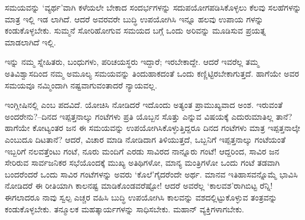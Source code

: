 ಸಮಯವನ್ನು ‘ವ್ಯರ್ಥ’ವಾಗಿ ಕಳೆಯಲೇ ಬೇಕಾದ ಸಂದರ್ಭಗಳನ್ನು ಸದುಪಯೋಗಪಡಿಸಿಕೊಳ್ಳಲು ಕೆಲವು ಸಲಹೆಗಳನ್ನು ಮಾತ್ರ ಇಲ್ಲಿ ಇಡ ಲಾಗಿದೆ. ಆದರೆ ಅವರವರೇ ಬುದ್ಧಿ ಉಪಯೋಗಿಸಿ ಇನ್ನೂ ಹಲವು ಉಪಾಯ ಗಳನ್ನು ಕಂಡುಕೊಳ್ಳಬೇಕು. ಸುಮ್ಮನೆ ಸೋರಿಹೋಗುವ ಸಮಯದ ಬಗ್ಗೆ ಒಂದು ಅರಿವನ್ನು ಮೂಡಿಸುವ ಪ್ರಯತ್ನ ಮಾಡಲಾಗಿದೆ ಇಲ್ಲಿ.

ಇನ್ನು ನಮ್ಮ ಸ್ನೇಹಿತರು, ಬಂಧುಗಳು, ಪರಿಚಯಸ್ಥರು ಇದ್ದಾರೆ; ಇರಬೇಕಾದ್ದೇ. ಆದರೆ ಇವರೆಲ್ಲ ತಮ್ಮ ಅತಿವಿಶ್ವಾಸದಿಂದ ನಮ್ಮ ಅಮೂಲ್ಯ ಸಮಯವನ್ನು ತಿಂದುಹಾಕದಂತೆ ಒಂದು ಕಣ್ಣಿಟ್ಟಿರಬೇಕಾಗುತ್ತದೆ. ಹಾಗೆಯೇ ಅವರ ಸಮಯವೂ ನಮ್ಮಿಂದಾಗಿ ನಷ್ಟವಾಗುವಂತಾದರೆ ನ್ಯಾಯವಲ್ಲ.

ಇಂಗ್ಲೀಷಿನಲ್ಲಿ ಎಂಬ ಪದವಿದೆ. ಯೋಚಿಸಿ ನೋಡಿದರೆ ಇದೊಂದು ಅತ್ಯಂತ ಪ್ರಾಮುಖ್ಯವಾದ ಅಂಶ.  ಇರುವಂತೆ  ಅಂದರೇನು?–ದಿನದ ಇಪ್ಪತ್ತನಾಲ್ಕು ಗಂಟೆಗಳು ಪ್ರತಿ ಯೊಬ್ಬನ ಸೊತ್ತು ಎನ್ನುವ ವಿಷಯಕ್ಕೆ ಎದುರುಮಾತಿಲ್ಲ ತಾನೆ? ಹಾಗೆಯೇ ಕೋಟ್ಯಂತರ ಜನ ಈ ಸಮಯವನ್ನು ಉಪಯೋಗಿಸಿಕೊಳ್ಳುತ್ತಿದ್ದರೂ ದಿನದ ಗಂಟೆಗಳು ಮಾತ್ರ ಇಪ್ಪತ್ತನಾಲ್ಕೇ ಎಂಬುದೂ ದಿಟತಾನೆ? ಆದರೆ, ವಿಚಾರ ಮಾಡಿ ನೋಡಿದಾಗ ತಿಳಿಯುತ್ತದೆ, ಒಬ್ಬನಿಗೆ ಇಪ್ಪತ್ತನಾಲ್ಕು ಗಂಟೆಯಂತೆ ಇಬ್ಬರಿಗೆ ನಲವತ್ತೆಂಟು ಗಂಟೆ, ನೂರು ಮಂದಿಗೆ ಎರಡು ಸಾವಿರದ ನಾನ್ನೂರು ಗಂಟೆ! ಆದ್ದರಿಂದ, ಸಾವಿರ ಜನ ಸೇರಿರುವ ಸಾರ್ವಜನಿಕರ ಸಭೆಯೊಂದಕ್ಕೆ ಮುಖ್ಯ ಅತಿಥಿಗಳೋ, ಮಾನ್ಯ ಮಂತ್ರಿಗಳೋ ಒಂದು ಗಂಟೆ ತಡವಾಗಿ ಬಂದರೆಂದರೆ ಒಂದು ಸಾವಿರ ಗಂಟೆಗಳನ್ನು ಅವರು ‘ಕೊಲೆ’ಗೈದರೆಂದೇ ಅರ್ಥ. ಮಾನವ ಇತಿಹಾಸವನ್ನೊಮ್ಮೆ ಭಾವಿಸಿ ನೋಡಿದರೆ ಈ ರೀತಿಯಾಗಿ ಕಾಲನಷ್ಟ ಮಾಡಿಕೊಂಡವರೆಷ್ಟೋ! ಆದರೆ ಅವರೆಲ್ಲ ‘ಕಾಲವಶ’ರಾಗಿಬಿಟ್ಟ ರೆನ್ನಿ! ಈಗಲಾದರೂ ನಾವು ಸ್ವಲ್ಪ ಎಚ್ಚರ ವಹಿಸಿ ಬುದ್ಧಿ ಉಪಯೋಗಿಸಿ ಕಾಲವನ್ನು ವಶದಲ್ಲಿಟ್ಟುಕೊಳ್ಳುವ ತಂತ್ರವನ್ನು ಕಂಡುಕೊಳ್ಳಬೇಕು. ತನ್ಮೂಲಕ ಮಹತ್ಕಾರ್ಯಗಳನ್ನು ಸಾಧಿಸಬೇಕು. ಮಹಾನ್ ವ್ಯಕ್ತಿಗಳಾಗಬೇಕು.

